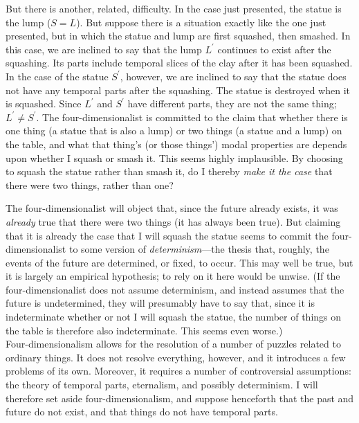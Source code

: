 \documentclass[12pt,twoside]{reedfancy}
\begin{document}
\begin{spacing}{1.25}
But there is another, related, difficulty.  In the case just
presented, the statue is the lump ($S = L$).  But suppose there is a
situation exactly like the one just presented, but in which the statue
and lump are first squashed, then smashed.  In this case, we are
inclined to say that the lump $L^{\prime}$ continues to exist after
the squashing.  Its parts include temporal slices of the clay after it
has been squashed.  In the case of the statue $S^{\prime}$, however,
we are inclined to say that the statue does not have any temporal
parts after the squashing.  The statue is destroyed when it is
squashed.  Since $L^{\prime}$ and $S^{\prime}$ have different parts,
they are not the same thing; $L^{\prime} \neq S^{\prime}$.  The
four-dimensionalist is committed to the claim that whether there is
one thing (a statue that is also a lump) or two things (a statue and a
lump) on the table, and what that thing's (or those things') modal
properties are depends upon whether I squash or smash it.  This seems
highly implausible.  By choosing to squash the statue rather than
smash it, do I thereby {\em make it the case} that there were two
things, rather than one?

The four-dimensionalist will object that, since the future already
exists, it was {\em already} true that there were two things (it has
always been true).  But claiming that it is already the case that I
will squash the statue seems to commit the four-dimensionalist to some
version of {\em determinism}---the thesis that, roughly, the events of
the future are determined, or fixed, to occur.  This may well be true,
but it is largely an empirical hypothesis; to rely on it here would be
unwise.  (If the four-dimensionalist does not assume determinism, and
instead assumes that the future is undetermined, they will presumably
have to say that, since it is indeterminate whether or not I will
squash the statue, the number of things on the table is therefore also
indeterminate.  This seems even worse.)\\

Four-dimensionalism allows for the resolution of a number of puzzles
related to ordinary things.  It does not resolve everything, however,
and it introduces a few problems of its own.  Moreover, it requires a
number of controversial assumptions: the theory of temporal parts,
eternalism, and possibly determinism.  I will therefore set aside
four-dimensionalism, and suppose henceforth that the past and future
do not exist, and that things do not have temporal parts.


\end{spacing}
\end{document}

